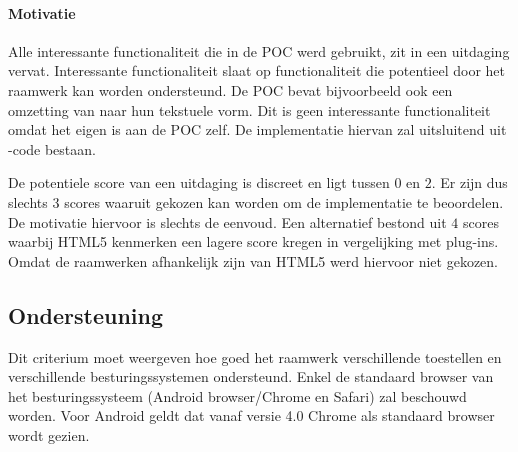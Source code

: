 \paragraph{Motivatie}

Alle interessante functionaliteit die in de POC werd gebruikt, zit in een uitdaging vervat.  
Interessante functionaliteit slaat op functionaliteit die potentieel door het raamwerk kan worden ondersteund.
De POC bevat bijvoorbeeld ook een omzetting van  naar hun tekstuele vorm.
Dit is geen interessante functionaliteit omdat het eigen is aan de POC zelf.
De implementatie hiervan zal uitsluitend uit  \js{}-code bestaan.

De potentiele score van een uitdaging is discreet en ligt tussen $0$ en $2$.
Er zijn dus slechts $3$ scores waaruit gekozen kan worden om de implementatie te beoordelen.
De motivatie hiervoor is slechts de eenvoud.
Een alternatief bestond uit $4$ scores waarbij HTML5 kenmerken een lagere score kregen in vergelijking met plug-ins.
Omdat de raamwerken afhankelijk zijn van HTML5 werd hiervoor niet gekozen.


\subsection{Ondersteuning}
\label{sec:vergelijking-ondersteuning}
Dit criterium moet weergeven hoe goed het raamwerk verschillende toestellen en verschillende besturingssystemen ondersteund.
Enkel de standaard browser van het besturingssysteem (Android browser/Chrome en Safari) zal beschouwd worden.
Voor Android geldt dat vanaf versie 4.0 Chrome als standaard browser wordt gezien. %


